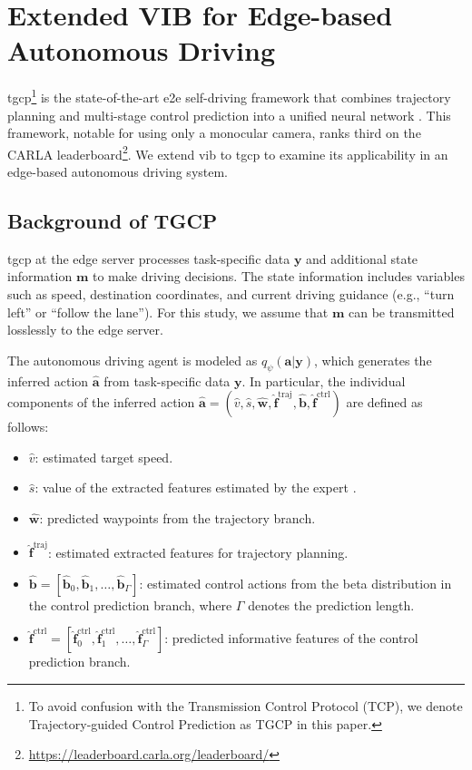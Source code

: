 \section{Extended VIB for Edge-based Autonomous Driving}
\label{sec:edge_AI}
\gls{tgcp}\footnote{To avoid confusion with the Transmission Control Protocol (TCP), we denote Trajectory-guided Control Prediction as TGCP in this paper.} is the state-of-the-art \gls{e2e} self-driving framework that combines trajectory planning and multi-stage control prediction into a unified neural network \cite{Wu_2022_TgC}. 
This framework, notable for using only a monocular camera, ranks third on the CARLA leaderboard\footnote{\url{https://leaderboard.carla.org/leaderboard/}}. 
We extend \gls{vib} to \gls{tgcp} to examine its applicability in an edge-based autonomous driving system.

\subsection{Background of TGCP}
\gls{tgcp} at the edge server processes task-specific data $\bm{y}$ and additional state information $\bm{m}$ to make driving decisions. The state information includes variables such as speed, destination coordinates, and current driving guidance (e.g., ``turn left'' or ``follow the lane''). For this study, we assume that $\bm{m}$ can be transmitted losslessly to the edge server. 

The autonomous driving agent is modeled as $q_{\psi}(\bm{a}|\bm{y})$, which generates the inferred action $\hat{\bm{a}}$ from task-specific data $\bm{y}$. In particular, the individual components of the inferred action $\hat{\bm{a}} = (\hat{v}, \hat{s}, \hat{\bm{w}}, \hat{\bm{f}}^{\text{traj}}, \hat{\bm{b}}, \hat{\bm{f}}^{\text{ctrl}})$ are defined as follows:
\begin{itemize}
    \item $\hat{v}$: estimated target speed.
    \item $\hat{s}$: value of the extracted features estimated by the expert \cite{Zhang_2021_EtE}.
    \item $\hat{\bm{w}}$: predicted waypoints from the trajectory branch.
    \item $\hat{\bm{f}}^{\text{traj}}$: estimated extracted features for trajectory planning.
    \item $\hat{\bm{b}} = [\hat{\bm{b}}_0, \hat{\bm{b}}_1, \dots, \hat{\bm{b}}_\Gamma]$: estimated control actions from the beta distribution in the control prediction branch, where $\Gamma$ denotes the prediction length.
    \item $\hat{\bm{f}}^{\text{ctrl}} = [\hat{\bm{f}}^{\text{ctrl}}_0, \hat{\bm{f}}^{\text{ctrl}}_1, \dots, \hat{\bm{f}}^{\text{ctrl}}_\Gamma]$: predicted informative features of the control prediction branch.
\end{itemize}

